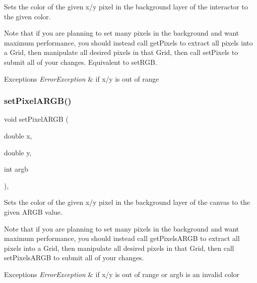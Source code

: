 Sets the color of the given x/y pixel in the background layer of the interactor to the given color. 

Note that if you are planning to set many pixels in the background and want maximum performance, you should instead call get\+Pixels to extract all pixels into a Grid, then manipulate all desired pixels in that Grid, then call set\+Pixels to submit all of your changes. Equivalent to set\+R\+GB.


\begin{DoxyExceptions}{Exceptions}
{\em Error\+Exception} & if x/y is out of range \\
\hline
\end{DoxyExceptions}
\mbox{\label{classGCanvas_ae189342d4b4235efa2ece08e08758499}} 
\subsubsection{\texorpdfstring{set\+Pixel\+A\+R\+G\+B()}{setPixelARGB()}\hspace{0.1cm}{\footnotesize\ttfamily [1/2]}}
{\footnotesize\ttfamily void set\+Pixel\+A\+R\+GB (\begin{DoxyParamCaption}\item[{double}]{x,  }\item[{double}]{y,  }\item[{int}]{argb }\end{DoxyParamCaption})\hspace{0.3cm}{\ttfamily [override]}, {\ttfamily [virtual]}}



Sets the color of the given x/y pixel in the background layer of the canvas to the given A\+R\+GB value. 

Note that if you are planning to set many pixels in the background and want maximum performance, you should instead call get\+Pixels\+A\+R\+GB to extract all pixels into a Grid, then manipulate all desired pixels in that Grid, then call set\+Pixels\+A\+R\+GB to submit all of your changes.


\begin{DoxyExceptions}{Exceptions}
{\em Error\+Exception} & if x/y is out of range or argb is an invalid color \\
\hline
\end{DoxyExceptions}


